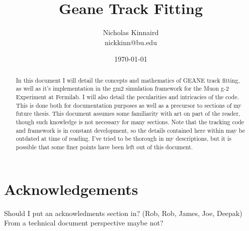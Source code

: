 \documentclass{article}
\begin{document}
\title{Geane Track Fitting}
\author{Nicholas Kinnaird \\ nickkinn@bu.edu}
\date{\today}
\maketitle

\begin{abstract}

    In this document I will detail the concepts and mathematics of GEANE track fitting, as well as it's implementation in the gm2 simulation framework for the Muon g-2 Experiment at Fermilab. I will also detail the pecularities and intricacies of the code. This is done both for documentation purposes as well as a precursor to sections of my future thesis. This document assumes some familiarity with art on part of the reader, though such knowledge is not necessary for many sections. Note that the tracking code and framework is in constant development, so the details contained here within may be outdated at time of reading. I've tried to be thorough in my descriptions, but it is possible that some finer points have been left out of this document.

\end{abstract}















\printbibliography

\section{Acknowledgements}

Should I put an acknowledments section in? (Rob, Rob, James, Joe, Deepak)
From a technical document perspective maybe not?







\end{document}
